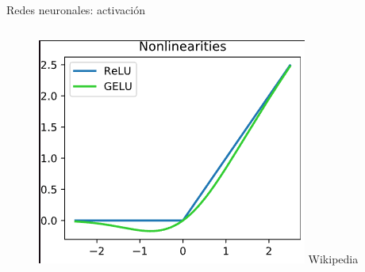 \begin{frame}{Redes neuronales: activación}
\begin{columns}[c]
\begin{column}{0.3\textwidth}
\end{column}
\begin{column}{0.3\textwidth}
    \centering
    \includegraphics[width=\textwidth]{figures/Introduccion/relu.png}
    \scriptsize{Wikipedia}
\end{column}
\begin{column}{0.3\textwidth}
    \centering

\end{column}
\end{columns}
\end{frame}
